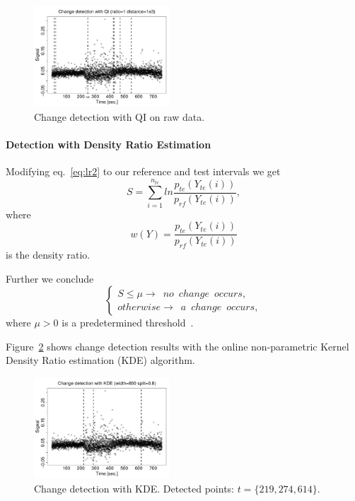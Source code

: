 \begin{figure}[htb!]
\includegraphics[width=0.45\textwidth]{pics/cfb_paper/PSD/PSDsteadyQI1}
\caption{Change detection with QI on raw data.}\label{figure12}
\end{figure}

\paragraph{Detection with Density Ratio Estimation}

Modifying eq.~\ref{eq:lr2} to our reference and test intervals we get
\begin{equation}\label{KDEformula}
S = \sum_{i=1}^{n_{te}}  ln \frac{p_{te}(Y_{te}(i))}{p_{rf}(Y_{te}(i))},
\end{equation}
where
\begin{equation}
w(Y)=\frac{p_{te}(Y_{te}(i))}{p_{rf}(Y_{te}(i))}
\end{equation}
is the density ratio.

Further we conclude
\begin{equation}
\begin{cases}
S \leq \mu \rightarrow \phantom{1} no \phantom{1} change \phantom{1} occurs, \\
otherwise  \rightarrow \phantom{1} a \phantom{1} change \phantom{1} occurs,
\end{cases}
\end{equation}
where $\mu >0$ is a predetermined threshold~\cite{Kawahara_2009}.

Figure~\ref{figure12.1} shows change detection results with the online non-parametric Kernel Density Ratio estimation (KDE) algorithm.
\begin{figure}[htb!]
\includegraphics[width=0.45\textwidth]{pics/cfb_paper/PSD/PSDkde}
\caption{Change detection with KDE. Detected points: $t=\{219,274,614\}$.}
\label{figure12.1}
\end{figure}

